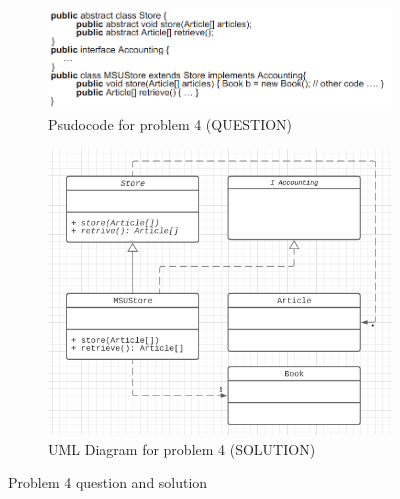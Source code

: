 \documentclass[11pt]{article}
\begin{document}
\begin{figure}[H]
    \centering
    \begin{subfigure}{0.5\textwidth}
		\centering
		\includegraphics[width=\textwidth]{./pics/prob4_prob.png}
		\caption{Psudocode for problem 4 (QUESTION)}
		\label{fig:prob4_prob}
	\end{subfigure}
	\begin{subfigure}{0.7\textwidth}
		\centering
		\includegraphics[width=\textwidth]{./pics/prob4_sol.png}
		\caption{UML Diagram for problem 4 (SOLUTION)}
		\label{fig:prob4_sol}
	\end{subfigure}
    \caption{Problem 4 question and solution}
    \label{fig:prob1}
\end{figure}

\newpage
\end{document}
